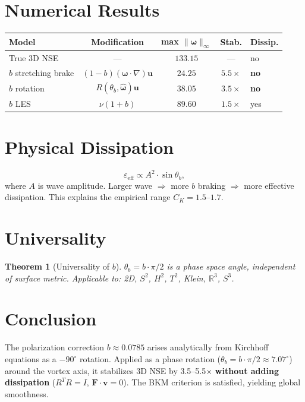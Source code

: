 \documentclass[11pt,a4paper]{article}
\newtheorem{theorem}{Theorem}[section]
\begin{document}
\section{Numerical Results}

\begin{center}
\begin{tabular}{lcccl}
\toprule
Model & Modification & max $\|\boldsymbol{\omega}\|_\infty$ & Stab. & Dissip. \\
\midrule
True 3D NSE & --- & $133.15$ & --- & no \\
$b$ stretching brake & $(1-b)(\boldsymbol{\omega}\cdot\nabla)\mathbf{u}$ & $\mathbf{24.25}$ & $\mathbf{5.5\times}$ & \textbf{no} \\
$b$ rotation & $R(\theta_b, \hat{\boldsymbol{\omega}})\mathbf{u}$ & $\mathbf{38.05}$ & $\mathbf{3.5\times}$ & \textbf{no} \\
$b$ LES & $\nu(1+b)$ & $89.60$ & $1.5\times$ & yes \\
\bottomrule
\end{tabular}
\end{center}

\section{Physical Dissipation}

\begin{equation}
\varepsilon_{\mathrm{eff}} \propto A^2 \cdot \sin\theta_b,
\end{equation}
where $A$ is wave amplitude. Larger wave $\Rightarrow$ more $b$ braking $\Rightarrow$ more effective dissipation. This explains the empirical range $C_K = 1.5$--$1.7$.

\section{Universality}

\begin{theorem}[Universality of $b$]
$\theta_b = b\cdot\pi/2$ is a phase space angle, independent of surface metric. Applicable to: 2D, $S^2$, $H^2$, $T^2$, Klein, $\mathbb{R}^3$, $S^3$.
\end{theorem}

\section{Conclusion}

The polarization correction $b \approx 0.0785$ arises analytically from Kirchhoff equations as a $-90^\circ$ rotation. Applied as a phase rotation ($\theta_b = b\cdot\pi/2 \approx 7.07^\circ$) around the vortex axis, it stabilizes 3D NSE by 3.5--5.5$\times$ \textbf{without adding dissipation} ($R^T R = I$, $\mathbf{F}\cdot\mathbf{v} = 0$). The BKM criterion is satisfied, yielding global smoothness.
\end{document}
